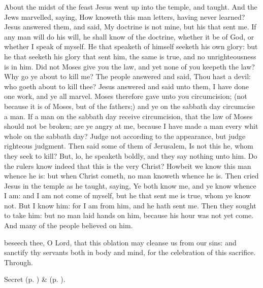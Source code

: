 
 About the midst of the feast Jesus went up into the temple, and taught. And the Jews marvelled, saying, How knoweth this man letters, having never learned? Jesus answered them, and said, My doctrine is not mine, but his that sent me. If any man will do his will, he shall know of the doctrine, whether it be of God, or whether I speak of myself. He that speaketh of himself seeketh his own glory: but he that seeketh his glory that sent him, the same is true, and no unrighteousness is in him. Did not Moses give you the law, and yet none of you keepeth the law? Why go ye about to kill me? The people answered and said, Thou hast a devil: who goeth about to kill thee? Jesus answered and said unto them, I have done one work, and ye all marvel. Moses therefore gave unto you circumcision; (not because it is of Moses, but of the fathers;) and ye on the sabbath day circumcise a man. If a man on the sabbath day receive circumcision, that the law of Moses should not be broken; are ye angry at me, because I have made a man every whit whole on the sabbath day? Judge not according to the appearance, but judge righteous judgment. Then said some of them of Jerusalem, Is not this he, whom they seek to kill? But, lo, he speaketh boldly, and they say nothing unto him. Do the rulers know indeed that this is the very Christ? Howbeit we know this man whence he is: but when Christ cometh, no man knoweth whence he is. Then cried Jesus in the temple as he taught, saying, Ye both know me, and ye know whence I am: and I am not come of myself, but he that sent me is true, whom ye know not. But I know him: for I am from him, and he hath sent me. Then they sought to take him: but no man laid hands on him, because his hour was not yet come. And many of the people believed on him.


\secret
{} beseech thee, O Lord, that this oblation may cleanse us from our sins: and sanctify thy servants both in body and mind, for the celebration of this sacrifice. Through.
\begin{rubric}
     Secret  (p. \pageref{AshWednesdayMassSecret}) \&   (p. \pageref{SPLivingDeparted}).
\end{rubric}

